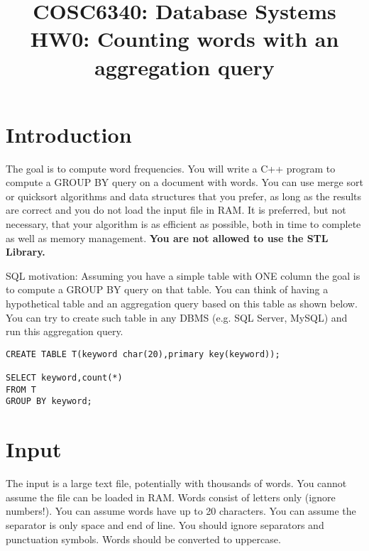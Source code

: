 

\title{COSC6340: Database Systems\\
HW0: Counting words with an aggregation query
}

\date{}



\pagestyle{plain}
\let\thepage\relax  %

\maketitle

\section{Introduction}

The goal is to compute word frequencies.
You will write a C++ program to compute a GROUP BY query on a document with words.
You can use merge sort or quicksort algorithms and data structures that you prefer, as long as the results are correct and you do not load the input file in RAM. 
It is preferred, but not necessary, that your algorithm is as efficient as possible, both in time to complete as well as memory management. \textbf{You are not allowed to use the STL Library.}

SQL motivation:
Assuming you have a simple table with ONE column the goal is to compute 
a GROUP BY query on that table. You can think of having a hypothetical
table and an aggregation query based on this table as shown below.
You can try to create such table in any DBMS (e.g. SQL Server, MySQL) 
and run this aggregation query.


\begin{verbatim}
CREATE TABLE T(keyword char(20),primary key(keyword));

SELECT keyword,count(*)
FROM T
GROUP BY keyword;
\end{verbatim}


\section{Input}

The input is a large text file, potentially with thousands of words.
You cannot assume the file can be loaded in RAM.
Words consist of letters only (ignore numbers!).
You can assume words have up to 20 characters.
%
You can assume the separator is only space and end of line.
You should ignore separators and punctuation symbols.
Words should be converted to uppercase.

